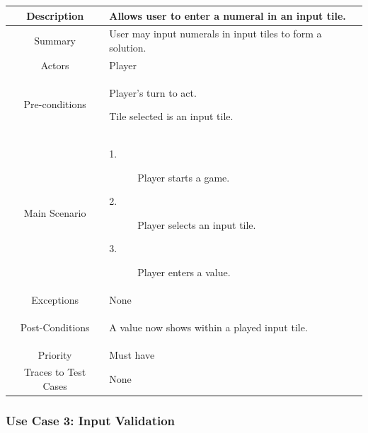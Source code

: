 \documentclass[12pt]{article}
\begin{document}
\begin{table}[htbp]
\begin{center}
\begin{tabular}{| c | m{10cm} |}
\hline
\cellcolor{lightgray}Description & Allows user to enter a numeral in an input tile. \\
\hline
\cellcolor{lightgray}Summary & User may input numerals in input tiles to form a solution. \\
\hline
\cellcolor{lightgray}Actors & Player \\
\hline
\cellcolor{lightgray}Pre-conditions &
\begin{description}[font=$\bullet$~\normalfont\scshape]
\item Player's turn to act.
\item Tile selected is an input tile. 
\end{description}\\
\hline
\cellcolor{lightgray}Main Scenario & 
\begin{description}
\item [1.]Player starts a game.
\item [2.]Player selects an input tile. 
\item [3.]Player enters a value.
\end{description}\\
\hline
\cellcolor{lightgray}Exceptions & None \\
\hline
\cellcolor{lightgray}Post-Conditions & 
\begin{description}[font=$\bullet$~\normalfont\scshape]
\item A value now shows within a played input tile.
\end{description}\\
\hline
\cellcolor{lightgray}Priority & Must have \\
\hline
\cellcolor{lightgray}Traces to Test Cases & None \\
\hline
\end{tabular}
\end{center}
\end{table}

\newpage
\pagestyle{plain} 
\subsubsection{Use Case 3: Input Validation} \label{uc:1}
\end{document}
